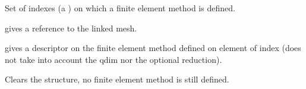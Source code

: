 \documentclass[a4paper,11pt,english]{sphinxmanual}
\begin{document}
\begin{fulllineitems}
\label{\detokenize{userdoc/bfem:_CPPv4N6getfem8mesh_fem12convex_indexEv}}%
\pysigstartmultiline
{}%
\pysigstopmultiline
Set of indexes (a ) on which a finite element method is defined.

\end{fulllineitems}


\begin{fulllineitems}
\label{\detokenize{userdoc/bfem:_CPPv4N6getfem8mesh_fem11linked_meshEv}}%
\pysigstartmultiline
{}%
\pysigstopmultiline
gives a reference to the linked mesh.

\end{fulllineitems}


\begin{fulllineitems}
\label{\detokenize{userdoc/bfem:_CPPv4N6getfem8mesh_fem14fem_of_elementE1i}}%
\pysigstartmultiline
{}%
\pysigstopmultiline
gives a descriptor on the finite element method defined on element of index
 (does not take into account the qdim nor the optional reduction).

\end{fulllineitems}


\begin{fulllineitems}
\label{\detokenize{userdoc/bfem:_CPPv4N6getfem8mesh_fem5clearEv}}%
\pysigstartmultiline
{}%
\pysigstopmultiline
Clears the structure, no finite element method is still defined.

\end{fulllineitems}
\end{document}
